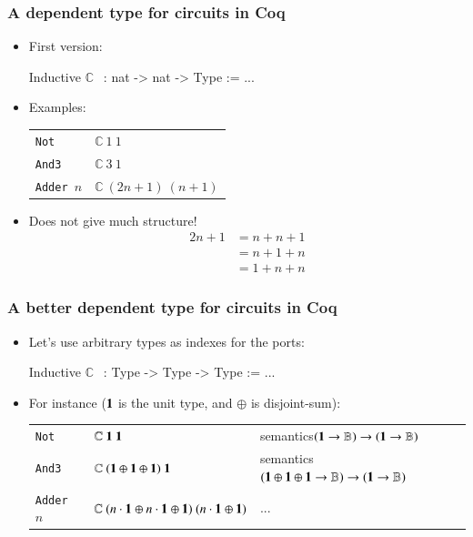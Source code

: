\documentclass[9pt]{beamer}
\begin{document}
\newcommand\circuit[2]{\mathbb{C}~#1~#2}
\begin{frame}[fragile]
  \frametitle{A dependent type for circuits in Coq}

  \begin{itemize}
  \item   First version:
    \begin{coq}
      Inductive $\circuit{}{}$ : nat -> nat -> Type := ...
    \end{coq}
  \item Examples:\\
    \begin{center}
      \begin{tabular}{l@{\quad:\quad}l}
        \texttt{Not} &
        $\circuit{1}{1}$ \\
        
        \texttt{And3} &
        $\circuit{3}{1}$\\
        \texttt{Adder $n$} &  $\circuit{(2n+1)}{(n+1)}$\\
      \end{tabular}
    \end{center}
    \pause
  \item Does not give much structure! 
    \begin{align*}
      2n+1 &= n+n+1 \\
      & = n+1+n \\
      & = 1+n+n
    \end{align*}
  \end{itemize}
  
\end{frame}
\newcommand\unit{{\bf 1}}
\newcommand\zero{{\bf 0}}
\newcommand\bool{\mathbb{B}}
\newcommand\sumn[2]{#2 \cdot \unit_{\tt #1}}


\begin{frame}[fragile]
  \frametitle{A better dependent type for circuits in Coq}
  \begin{itemize}
  \item Let's use arbitrary types as \alert{indexes} for the ports:
  \begin{coq}
Inductive $\circuit{}{}$ : Type -> Type -> Type := ...      
\end{coq}
\item For instance ($\unit$ is the unit type, and $\oplus$ is
  disjoint-sum):
  \begin{tabular}{l@{\quad:\quad}ll}
    \texttt{Not} &
    $\circuit{\unit}{\unit}$ &
    \alert{semantics$(\unit \to \bool) \to (\unit \to \bool)$} \\
    
    \texttt{And3} &
    $\circuit{(\unit{} \oplus{} \unit{}  \oplus{} \unit{})}{\unit{}}$& 
    \alert{semantics $(\unit \oplus \unit \oplus \unit \to \bool) \to (\unit \to \bool)$} \\
    \texttt{Adder $n$} &  $\circuit{(\sumn{}{n} \oplus \sumn{}{n} \oplus{} \unit{})}{(\sumn{}{n} \oplus \unit)}$     & \alert{...}
  \end{tabular}
\end{itemize}
\pause
{}
\end{frame}
\end{document}
